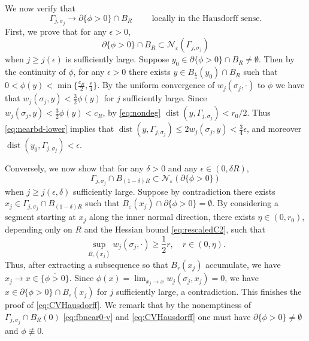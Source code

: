 \documentclass[11pt]{article}
\numberwithin{equation}{section}
\theoremstyle{definition}
\begin{document}
We now verify that 
\begin{equation}\label{eq:CVHausdorff}
    \Gamma_{j,\sigma_j} \to \partial\{\phi>0\}\cap B_R \qquad \text{ locally in the Hausdorff sense}. 
\end{equation} 
First, we prove that for any $\epsilon>0$,
\begin{equation}
   \partial\{\phi>0\} \cap B_{R} \subset \mathcal{N}_{\varepsilon}( \Gamma_{j,\sigma_j})
\end{equation} 
when $j \geq j(\epsilon)$ is sufficiently large. 
Suppose $y_0\in \partial\{\phi>0\} \cap B_R \neq \emptyset$. Then by the continuity of $\phi$, for any $\epsilon>0$ there exists $y\in B_{\frac{\epsilon}{4}}(y_0)\cap B_R$ such that $0<\phi(y)< \min\{\frac{c_R}{2}, \frac{\epsilon}{4} \}$. By the uniform convergence of $w_j(\sigma_j,\cdot)$ to $\phi$ we have that $w_j(\sigma_j, y)< \frac32 \phi(y)$ for $j$ sufficiently large. Since $w_j(\sigma_j, y) < \frac32 \phi(y) < c_R$, by \eqref{eq:nondeg} $\operatorname{dist}(y,\Gamma_{j,\sigma_j}) < r_0/2$. Thus \eqref{eq:nearbd-lower} implies that $\operatorname{dist}(y,\Gamma_{j,\sigma_j}) \leq 2w_j(\sigma_j,y) < \frac34 \epsilon$, and moreover $\operatorname{dist}(y_0,\Gamma_{j,\sigma_j}) < \epsilon$. 


Conversely, we now show that for any $\delta>0$ and any $\epsilon \in (0,\delta R)$,
\begin{equation}
    \Gamma_{j,\sigma_j}\cap B_{(1-\delta)R} \subset \mathcal{N}_{\varepsilon}( \partial\{\phi>0\})
\end{equation}
when $j\geq j(\epsilon,\delta)$ sufficiently large. Suppose by contradiction there exists $x_j \in \Gamma_{j,\sigma_j}\cap B_{(1-\delta)R}$ such that $B_{\varepsilon}(x_j)\cap \partial\{\phi>0\}=\emptyset$.
By considering a segment starting at $x_j$ along the inner normal direction, there exists $\eta \in (0, r_0 )$, depending only  on $R$ and the Hessian bound \eqref{eq:rescaledC2}, such that
\begin{equation}
\sup_{B_{r}(x_j)}w_j(\sigma_j,\cdot)\geq \frac{1}{2}r, \quad r \in (0,\eta).
\end{equation}
Thus, after extracting a subsequence so that $B_r(x_j)$ accumulate, we have $x_j\to x \in \overline{\{\phi>0\}}$. Since $\phi(x)=\lim_{x_j\to x}w_j(\sigma_j,x_j) = 0$, we have $x\in \partial \{\phi>0\} \cap B_{\varepsilon}(x_j)$ for 
$j$ sufficiently large, a contradiction. This finishes the proof of \eqref{eq:CVHausdorff}. We remark that by the nonemptiness of $\Gamma_{j, \sigma_j} \cap B_R(0)$ \eqref{eq:fbnear0-v} and \eqref{eq:CVHausdorff} one must have $\partial \{\phi > 0\} \neq \emptyset$ and $\phi \not\equiv 0$.
\end{document}
